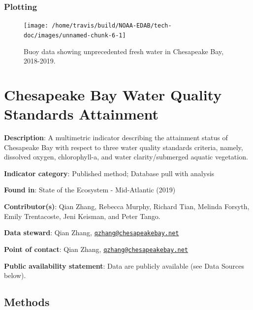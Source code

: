 \documentclass[
]{book}
\begin{document}
\hypertarget{plotting-4}{%
\subsection{Plotting}\label{plotting-4}}

\begin{figure}

{\centering \texttt{[image: /home/travis/build/NOAA-EDAB/tech-doc/images/unnamed-chunk-6-1]} 

}

\caption{Buoy data showing unprecedented fresh water in Chesapeake Bay, 2018-2019.}\label{fig:unnamed-chunk-6}
\end{figure}

\hypertarget{chesapeake-bay-water-quality-standards-attainment}{%
\chapter{Chesapeake Bay Water Quality Standards Attainment}\label{chesapeake-bay-water-quality-standards-attainment}}

\textbf{Description}: A multimetric indicator describing the attainment status of Chesapeake Bay with respect to three water quality standards criteria, namely, dissolved oxygen, chlorophyll-a, and water clarity/submerged aquatic vegetation.

\textbf{Indicator category}: Published method; Database pull with analysis

\textbf{Found in}: State of the Ecosystem - Mid-Atlantic (2019)

\textbf{Contributor(s)}: Qian Zhang, Rebecca Murphy, Richard Tian, Melinda Forsyth, Emily Trentacoste, Jeni Keisman, and Peter Tango.

\textbf{Data steward}: Qian Zhang, \href{mailto:qzhang@chesapeakebay.net}{\nolinkurl{qzhang@chesapeakebay.net}}

\textbf{Point of contact}: Qian Zhang, \href{mailto:qzhang@chesapeakebay.net}{\nolinkurl{qzhang@chesapeakebay.net}}

\textbf{Public availability statement}: Data are publicly available (see Data Sources below).

\hypertarget{methods-7}{%
\section{Methods}\label{methods-7}}
\end{document}
